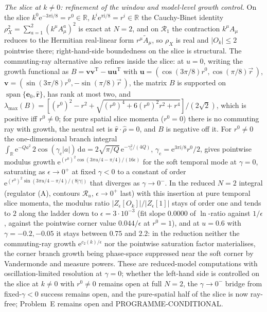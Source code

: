 \emph{The slice at \(k\ne0\): refinement of the window and model-level growth control.} On the slice \(k^0\mathrm e^{-3\pi\mathrm i/8}=r^0\in\mathbb R\), \(k^i\mathrm e^{\pi\mathrm i/8}=r^i\in\mathbb R\) the Cauchy-Binet identity \(\rho_X^2=\sum_{a=1}^{2}{(k^\mu A^a_\mu)}^2\) is exact at \(N=2\), and on \(\mathcal R_1\) the contraction \(k^\mu A_\mu\) reduces to the Hermitian real-linear form \(r^\mu\tilde A_\mu\), so \(\rho_X\) is real and \(|O_k|\le2\) pointwise there; right-hand-side boundedness on the slice is structural. The commuting-ray alternative also refines inside the slice: at \(u=0\), writing the growth functional as \(B=\mathbf v\mathbf v^{\mathrm T}-\mathbf u\mathbf u^{\mathrm T}\) with \(\mathbf u=(\cos(3\pi/8)r^0,\cos(\pi/8)\vec r\,)\), \(\mathbf v=(\sin(3\pi/8)r^0,-\sin(\pi/8)\vec r\,)\), the matrix \(B\) is supported on \(\operatorname{span}\{\mathbf e_0,\hat{\mathbf r}\}\), has rank at most two, and \(\lambda_{\max}(B)=[{(r^0)}^2-r^2+\sqrt{{(r^0)}^4+6{(r^0)}^2r^2+r^4}]/(2\sqrt2)\), which is positive iff \(r^0\ne0\); for pure spatial slice momenta (\(r^0=0\)) there is no commuting ray with growth, the neutral set is \(\hat{\mathbf r}\cdot\hat\rho=0\), and \(B\) is negative off it. For \(r^0\ne0\) the one-dimensional branch integral \(\int_{\mathbb R}\mathrm e^{-Qa^2}\,2\cos(\gamma_{\mathrm c}|a|)\,\mathrm da=2\sqrt{\pi/Q}\,\mathrm e^{-\gamma_{\mathrm c}^2/(4Q)}\), \(\gamma_{\mathrm c}=\mathrm e^{3\pi\mathrm i/8}r^0/2\), gives pointwise modulus growth \(\mathrm e^{{(r^0)}^2\cos(3\pi u/4-\pi/4)/(16\epsilon)}\) for the soft temporal mode at \(\gamma=0\), saturating as \(\epsilon\to0^+\) at fixed \(\gamma<0\) to a constant of order \(\mathrm e^{{(r^0)}^2\sin(3\pi u/4-\pi/4)/(8|\gamma|)}\) that diverges as \(\gamma\to0^-\). In the reduced \(N=2\) integral (regulator (A), contours \(\mathcal R_u\), \(\epsilon\to0^+\) last) with this insertion at pure temporal slice momenta, the modulus ratio \(|Z_\epsilon[O_k]|/|Z_\epsilon[1]|\) stays of order one and tends to \(2\) along the ladder down to \(\epsilon=3\cdot10^{-3}\) (fit slope \(0.0000\) of \(\ln\)-ratio against \(1/\epsilon\), against the pointwise corner value \(0.044/\epsilon\) at \(r^0=1\)), and at \(u=0.6\) with \(\gamma=-0.2,-0.05\) it stays between \(0.75\) and \(2.2\): in the reduction neither the commuting-ray growth \(\mathrm e^{c_2(k)/\epsilon}\) nor the pointwise saturation factor materialises, the corner branch growth being phase-space suppressed near the soft corner by Vandermonde and measure powers. These are reduced-model computations with oscillation-limited resolution at \(\gamma=0\); whether the left-hand side is controlled on the slice at \(k\ne0\) with \(r^0\ne0\) remains open at full \(N=2\), the \(\gamma\to0^-\) bridge from fixed-\(\gamma<0\) success remains open, and the pure-spatial half of the slice is now ray-free; Problem~E remains open and PROGRAMME-CONDITIONAL.
